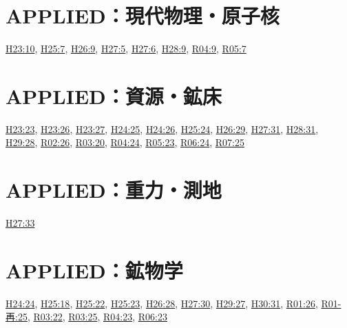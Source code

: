 \section{APPLIED：現代物理・原子核}
\hyperref[q:h23-reg-applied-10]{H23:10}, \hyperref[q:h25-reg-applied-07]{H25:7}, \hyperref[q:h26-reg-applied-09]{H26:9}, \hyperref[q:h27-reg-applied-05]{H27:5}, \hyperref[q:h27-reg-applied-06]{H27:6}, \hyperref[q:h28-reg-applied-09]{H28:9}, \hyperref[q:r04-reg-applied-09]{R04:9}, \hyperref[q:r05-reg-applied-07]{R05:7}
\section{APPLIED：資源・鉱床}
\hyperref[q:h23-reg-applied-23]{H23:23}, \hyperref[q:h23-reg-applied-26]{H23:26}, \hyperref[q:h23-reg-applied-27]{H23:27}, \hyperref[q:h24-reg-applied-25]{H24:25}, \hyperref[q:h24-reg-applied-26]{H24:26}, \hyperref[q:h25-reg-applied-24]{H25:24}, \hyperref[q:h26-reg-applied-29]{H26:29}, \hyperref[q:h27-reg-applied-31]{H27:31}, \hyperref[q:h28-reg-applied-31]{H28:31}, \hyperref[q:h29-reg-applied-28]{H29:28}, \hyperref[q:r02-reg-applied-26]{R02:26}, \hyperref[q:r03-reg-applied-20]{R03:20}, \hyperref[q:r04-reg-applied-24]{R04:24}, \hyperref[q:r05-reg-applied-23]{R05:23}, \hyperref[q:r06-reg-applied-24]{R06:24}, \hyperref[q:r07-reg-applied-25]{R07:25}
\section{APPLIED：重力・測地}
\hyperref[q:h27-reg-applied-33]{H27:33}
\section{APPLIED：鉱物学}
\hyperref[q:h24-reg-applied-24]{H24:24}, \hyperref[q:h25-reg-applied-18]{H25:18}, \hyperref[q:h25-reg-applied-22]{H25:22}, \hyperref[q:h25-reg-applied-23]{H25:23}, \hyperref[q:h26-reg-applied-28]{H26:28}, \hyperref[q:h27-reg-applied-30]{H27:30}, \hyperref[q:h29-reg-applied-27]{H29:27}, \hyperref[q:h30-reg-applied-31]{H30:31}, \hyperref[q:r01-reg-applied-26]{R01:26}, \hyperref[q:r01-ret-applied-25]{R01-再:25}, \hyperref[q:r03-reg-applied-22]{R03:22}, \hyperref[q:r03-reg-applied-25]{R03:25}, \hyperref[q:r04-reg-applied-23]{R04:23}, \hyperref[q:r06-reg-applied-23]{R06:23}
